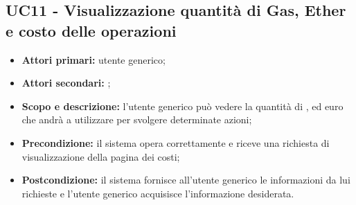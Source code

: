 \documentclass[AnalisiDeiRequisiti.tex]{subfiles}
\begin{document}
\subsection{UC11 - Visualizzazione quantità di Gas, Ether e costo delle operazioni}
\begin{itemize}
	\item \textbf{Attori primari:} utente generico;
	\item \textbf{Attori secondari:} ;
	\item \textbf{Scopo e descrizione:} l'utente generico può vedere la quantità di ,  ed euro che andrà a utilizzare per svolgere determinate azioni;
	\item \textbf{Precondizione:} il sistema opera correttamente e riceve una richiesta di visualizzazione della pagina dei costi;
	\item \textbf{Postcondizione:} il sistema fornisce all'utente generico le informazioni da lui richieste e l'utente generico acquisisce l'informazione desiderata.
\end{itemize}
\end{document}
